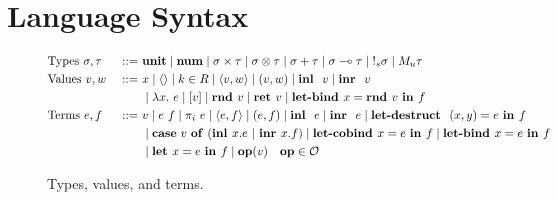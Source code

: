 \section{Language Syntax}

\begin{figure}[tbp]
  \begin{alignat*}{3}
         &\text{Types } \sigma, \tau &::=~ &\mathbf{unit}
         \mid \textbf{num}
         \mid \sigma \times \tau 
         \mid \sigma \otimes \tau
         \mid \sigma + \tau 
         \mid \sigma \multimap \tau
         \mid {{!_{s}} \sigma}
         \mid {M_u \tau}
         \\
         &\text{Values } v, w \ &::=~ &x
         \mid \langle \rangle
         \mid k \in R
         \mid \langle v,w \rangle 
         \mid  (v, w)
         \mid \textbf{inl } \ v
         \mid \textbf{inr } \ v
         \\
         & & & \mid \lambda x.~e 
         \mid [v]
         \mid\textbf{rnd } v
         \mid {\textbf{ret }v} 
         \mid \textbf{let-bind } x = \textbf{rnd } v \ \textbf{in } f \\
         &\text{Terms } e, f &::=~ & v
         \mid e~f
         \mid {\pi}_i\ e
         \mid \langle e,f \rangle 
         \mid  (e, f)
         \mid \textbf{inl } \ e
         \mid \textbf{inr } \ e
         \mid \textbf{let-destruct } \ (x,y) = e \ \textbf{in } f \\
         & & & \mid \mathbf{case} \ v \ \mathbf{of} \ (\textbf{inl } x.e \ | \ \textbf{inr } x.f) 
         \mid \textbf{let-cobind } x = e \ \textbf{in }  f
         \mid {\textbf{let-bind }x = e \ \textbf{in }f} \\
         & & & \mid \textbf{let } x  = e \ \textbf{in }  f 
         \mid \mathbf{op}(v) \quad \mathbf{op} \in \mathcal{O}
  \end{alignat*}
  \caption{Types, values, and terms.}
  \label{fig:syntax}
\end{figure}


